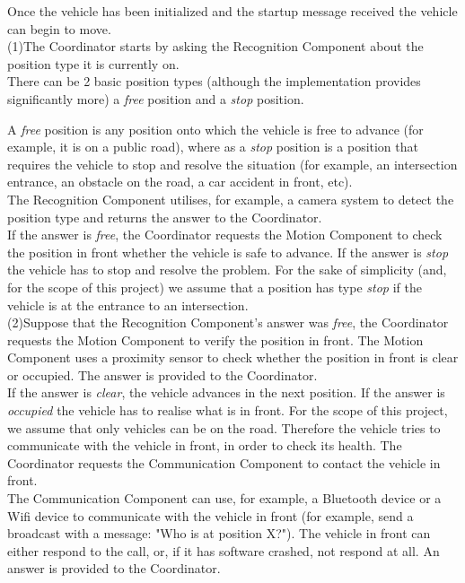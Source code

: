 \documentclass{memoir}
\begin{document}
Once the vehicle has been initialized and the startup message received the vehicle can begin to move. 
\\

(1)The Coordinator starts by asking the Recognition Component about the position type it is currently on. 
\\

There can be 2 basic position types (although the implementation provides significantly more) a \textit{free} position and a \textit{stop} position.

A \textit{free} position is any position onto which the vehicle is free to advance (for example, it is on a public road), where as a \textit{stop} position is a position that requires the vehicle to stop and resolve the situation (for example, an intersection entrance, an obstacle on the road, a 
car accident in front, etc).
\\

The Recognition Component utilises, for example, a camera system to detect the position type and returns the answer to the Coordinator.
\\

If the answer is \textit{free}, the Coordinator requests the Motion Component to check the position in front whether the vehicle is safe to advance.
If the answer is \textit{stop} the vehicle has to stop and resolve the problem. For the sake of simplicity (and, for the scope of this project) we assume that a position has type \textit{stop} if the vehicle is at the entrance to an intersection.
\\

 (2)Suppose that the Recognition Component's answer was \textit{free}, the Coordinator requests the Motion Component to verify the position in front. The Motion Component uses a proximity sensor to check whether the position in front is clear or occupied. The answer is provided to the Coordinator.
\\

If the answer is \textit{clear}, the vehicle advances in the next position. If the answer is \textit{occupied} the vehicle has to realise what is in front. For the scope of this project, we assume that only vehicles can be on the road. Therefore the vehicle tries to communicate with the vehicle in front, in order to check its health. The Coordinator requests the Communication Component to contact the vehicle in front.
\\

The Communication Component can use, for example, a Bluetooth device or a Wifi device to communicate with the vehicle in front (for example, send a broadcast with a message: "Who is at position X?"). The vehicle in front can either respond to the call, or, if it has software crashed, not respond at all. An answer is provided to the Coordinator.
\\
\end{document}
